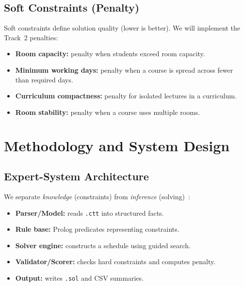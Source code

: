 \documentclass[11pt,letterpaper]{article}
\begin{document}
\subsection{Soft Constraints (Penalty)}
Soft constraints define solution quality (lower is better). We will implement the Track~2 penalties:
\begin{itemize}[nosep]
  \item \textbf{Room capacity:} penalty when students exceed room capacity.
  \item \textbf{Minimum working days:} penalty when a course is spread across fewer than required days.
  \item \textbf{Curriculum compactness:} penalty for isolated lectures in a curriculum.
  \item \textbf{Room stability:} penalty when a course uses multiple rooms.
\end{itemize}

\section{Methodology and System Design}
\subsection{Expert-System Architecture}
We separate \textit{knowledge} (constraints) from \textit{inference} (solving)~\cite{guyette1994rule}:
\begin{itemize}[nosep]
  \item \textbf{Parser/Model:} reads \texttt{.ctt} into structured facts.
  \item \textbf{Rule base:} Prolog predicates representing constraints.
  \item \textbf{Solver engine:} constructs a schedule using guided search.
  \item \textbf{Validator/Scorer:} checks hard constraints and computes penalty.
  \item \textbf{Output:} writes \texttt{.sol} and CSV summaries.
\end{itemize}
\end{document}
